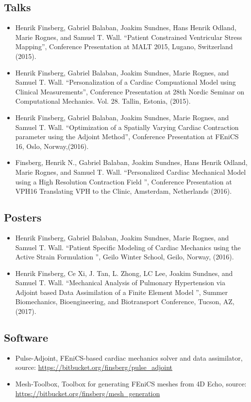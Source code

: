 \subsection{Talks}
\begin{itemize}
  \item Henrik Finsberg, Gabriel Balaban, Joakim Sundnes, Hans
    Henrik Odland, Marie Rognes, and Samuel T. Wall. ``Patient
    Constrained Ventricular Stress Mapping'',
    Conference Presentation at MALT 2015,  Lugano, Switzerland (2015).
  \item Henrik Finsberg, Gabriel Balaban, Joakim Sundnes, Marie
    Rognes, and Samuel T. Wall. ``Personalization of a Cardiac
    Compuational Model using Clinical Measurements'', Conference
    Presentation at 28th Nordic Seminar on Computational
    Mechanics. Vol. 28. Tallin, Estonia, (2015).
  \item Henrik Finsberg, Gabriel Balaban, Joakim Sundnes, Marie
    Rognes, and Samuel T. Wall. ``Optimization of a Spatially Varying
    Cardiac Contraction parameter using the Adjoint Method'',
    Conference Presentation at FEniCS 16, Oslo, Norway,(2016).
  \item Finsberg, Henrik N., Gabriel Balaban, Joakim Sundnes, Hans
    Henrik Odland, Marie Rognes, and Samuel T. Wall. ``Personalized
    Cardiac Mechanical Model using a High Resolution Contraction Field
    '',  Conference Presentation at VPH16 Translating VPH to the
    Clinic,  Amsterdam, Netherlands (2016).
\end{itemize}


\subsection{Posters}
\begin{itemize}
  \item Henrik Finsberg, Gabriel Balaban, Joakim Sundnes, Marie
    Rognes, and Samuel T. Wall. ``Patient Specific Modeling of Cardiac
    Mechanics using the Active Strain Formulation '',
    Geilo Winter School, Geilo, Norway, (2016).
  \item Henrik Finsberg, Ce Xi, J. Tan, L. Zhong, LC Lee, Joakim
    Sundnes, and Samuel T. Wall. ``Mechanical Analysis of Pulmonary
    Hypertension via Adjoint based Data Assimilation of a Finite
    Element Model '', Summer Biomechanics, Bioengineering, and
    Biotransport Conference, Tucson, AZ, (2017). 
  \end{itemize}


\subsection{Software}
\begin{itemize}
  \item Pulse-Adjoint, FEniCS-based cardiac mechanics solver and data
    assimilator, source: \url{https://bitbucket.org/finsberg/pulse_adjoint}
  \item Mesh-Toolbox, Toolbox for generating FEniCS meshes from 4D
    Echo,  source: \url{https://bitbucket.org/finsberg/mesh_generation}
\end{itemize}


